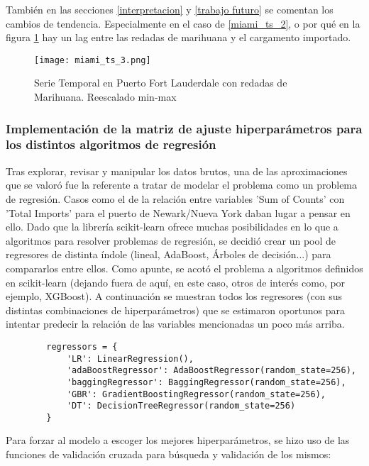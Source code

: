 \documentclass[12pt]{article}
\begin{document}
	También en las secciones \ref{interpretacion} y \ref{trabajo futuro} se comentan los cambios de tendencia. Especialmente en el caso de \ref{miami_ts_2}, o por qué en la figura \ref{miami_ts_3} hay un lag entre las redadas de marihuana y el cargamento importado.
	
	\begin{figure}[H]
		\caption{\label{miami_ts_3} Serie Temporal en Puerto Fort Lauderdale con redadas de Marihuana. Reescalado min-max}
		\centering
		\hspace*{1cm}
		\texttt{[image: miami\_ts\_3.png]}
	\end{figure}
	
	\subsubsection{\label{hiperCV}Implementación de la matriz de ajuste hiperparámetros para los distintos algoritmos de regresión}
	Tras explorar, revisar y manipular los datos brutos, una de las aproximaciones que se valoró fue la referente a tratar de modelar el problema como un problema de regresión. Casos como el de la relación entre variables 'Sum of Counts' con 'Total Imports' para el puerto de Newark/Nueva York daban lugar a pensar en ello. Dado que la librería scikit-learn ofrece muchas posibilidades en lo que a algoritmos para resolver problemas de regresión, se decidió crear un pool de regresores de distinta índole (lineal, AdaBoost, Árboles de decisión...) para compararlos entre ellos. Como apunte, se acotó el problema a algoritmos definidos en scikit-learn (dejando fuera de aquí, en este caso, otros de interés como, por ejemplo, XGBoost). A continuación se muestran todos los regresores (con sus distintas combinaciones de hiperparámetros) que se estimaron oportunos para intentar predecir la relación de las variables mencionadas un poco más arriba.
	
	\begin{verbatim}
		regressors = {
			'LR': LinearRegression(),
			'adaBoostRegressor': AdaBoostRegressor(random_state=256),
			'baggingRegressor': BaggingRegressor(random_state=256),
			'GBR': GradientBoostingRegressor(random_state=256),
			'DT': DecisionTreeRegressor(random_state=256)
		}
	\end{verbatim}

	Para forzar al modelo a escoger los mejores hiperparámetros, se hizo uso de las funciones de validación cruzada para búsqueda y validación de los mismos:
	
\end{document}
